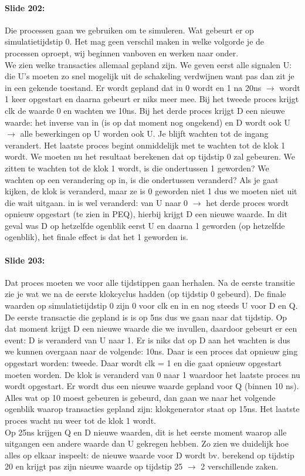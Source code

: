 \documentclass[10pt,a4paper]{book}
\begin{document}
\paragraph{Slide 202:} Die processen gaan we gebruiken om te simuleren. Wat gebeurt er op simulatietijdstip 0. Het mag geen verschil maken in welke volgorde je de processen oproept, wij beginnen vanboven en werken naar onder.\\
We zien welke transacties allemaal gepland zijn. We geven eerst alle signalen U: die U's moeten zo snel mogelijk uit de schakeling verdwijnen want pas dan zit je in een gekende toestand. Er wordt gepland dat in 0 wordt en 1 na 20ns $\rightarrow$ wordt 1 keer opgestart en daarna gebeurt er niks meer mee. Bij het tweede proces krijgt clk de waarde 0 en wachten we 10ns. Bij het derde proces krijgt D een nieuwe waarde: het inverse van in (is op dat moment nog ongekend) en D wordt ook U $\rightarrow$ alle bewerkingen op U worden ook U. Je blijft wachten tot de ingang verandert. Het laatste proces begint onmiddelijk met te wachten tot de klok 1 wordt. We moeten nu het resultaat berekenen dat op tijdstip 0 zal gebeuren. We zitten te wachten tot de klok 1 wordt, is die ondertussen 1 geworden? We wachten op een verandering op in, is die ondertussen veranderd? Als je gaat kijken, de klok is veranderd, maar ze is 0 geworden niet 1 dus we moeten niet uit die wait uitgaan. in is wel veranderd: van U naar 0 $\rightarrow$ het derde proces wordt opnieuw opgestart (te zien in PEQ), hierbij krijgt D een nieuwe waarde. In dit geval was D op hetzelfde ogenblik eerst U en daarna 1 geworden (op hetzelfde ogenblik), het finale effect is dat het 1 geworden is.

\paragraph{Slide 203:} Dat proces moeten we voor alle tijdstippen gaan herhalen. Na de eerste transitie zie je wat we na de eerste klokcyclus hadden (op tijdstip 0 gebeurd). De finale waarden op simulatietijdstip 0 zijn 0 voor clk en in en nog steeds U voor D en Q. De eerste transactie die gepland is is op 5ns dus we gaan naar dat tijdstip. Op dat moment krijgt D een nieuwe waarde die we invullen, daardoor gebeurt er een event: D is veranderd van U naar 1. Er is niks dat op D aan het wachten is dus we kunnen overgaan naar de volgende: 10ns. Daar is een proces dat opnieuw ging opgestart worden: tweede. Daar wordt clk = 1 en die gaat opnieuw opgestart moeten worden. De klok is veranderd van 0 naar 1 waardoor het laatste proces nu wordt opgestart. Er wordt dus een nieuwe waarde gepland voor Q (binnen 10 ns). Alles wat op 10 moest gebeuren is gebeurd, dan gaan we naar het volgende ogenblik waarop transacties gepland zijn: klokgenerator staat op 15ns. Het laatste proces wacht nu weer tot de klok 1 wordt.\\
Op 25ns krijgen Q en D nieuwe waarden, dit is het eerste moment waarop alle uitgangen een andere waarde dan U gekregen hebben. Zo zien we duidelijk hoe alles op elkaar inspeelt: de nieuwe waarde voor D wordt bv. berekend op tijdstip 20 en krijgt pas zijn nieuwe waarde op tijdstip 25 $\rightarrow$ 2 verschillende zaken. 
\end{document}
